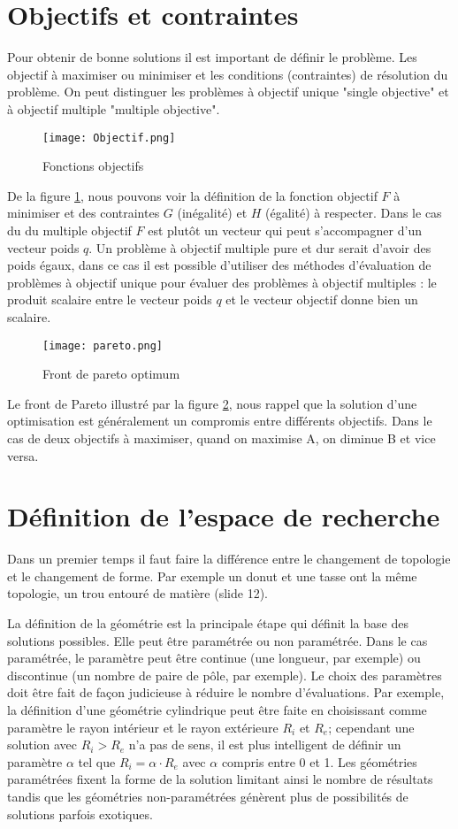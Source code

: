 \section{Objectifs et contraintes}
Pour obtenir de bonne solutions il est important de définir le problème. Les objectif à maximiser ou minimiser et les conditions (contraintes) de résolution du problème. On peut distinguer les problèmes à objectif unique "single objective" et à objectif multiple "multiple objective". 
\begin{figure}[H]
    \centering
    \texttt{[image: Objectif.png]}
    \caption{Fonctions objectifs}
    \label{fig:objection}
\end{figure}
De la figure \ref{fig:objection}, nous pouvons voir la définition de la fonction objectif $F$ à minimiser et des contraintes $G$ (inégalité) et $H$ (égalité) à respecter. Dans le cas du du multiple objectif $F$ est plutôt un vecteur qui peut s'accompagner d'un vecteur poids $q$. Un problème à objectif multiple pure et dur serait d'avoir des poids égaux, dans ce cas il est possible d'utiliser des méthodes d'évaluation de problèmes à objectif unique pour évaluer des problèmes à objectif multiples : le produit scalaire entre le vecteur poids $q$ et le vecteur objectif donne bien un scalaire. 
\begin{figure}[H]
    \centering
    \texttt{[image: pareto.png]}
    \caption{Front de pareto optimum}
    \label{fig:Pareto}
\end{figure}
Le front de Pareto illustré par la figure \ref{fig:Pareto}, nous rappel que la solution d'une optimisation est généralement un compromis entre différents objectifs. Dans le cas de deux objectifs à maximiser, quand on maximise A, on diminue B et vice versa.

\section{Définition de l'espace de recherche}
Dans un premier temps il faut faire la différence entre le changement de topologie et le changement de forme. Par exemple un donut et une tasse ont la même topologie, un trou entouré de matière (slide 12). 

La définition de la géométrie est la principale étape qui définit la base des solutions possibles. Elle peut être paramétrée ou non paramétrée. Dans le cas paramétrée, le paramètre peut être continue (une longueur, par exemple) ou discontinue (un nombre de paire de pôle, par exemple). Le choix des paramètres doit être fait de façon judicieuse à réduire le nombre d'évaluations. Par exemple, la définition d'une géométrie cylindrique peut être faite en choisissant comme paramètre le rayon intérieur et le rayon extérieure $ R_i$ et $R_e$; cependant une solution avec $R_i>R_e$ n'a pas de sens, il est plus intelligent de définir un paramètre $\alpha$ tel que $R_i = \alpha \cdot R_e$  avec $\alpha$ compris entre 0 et 1.  Les géométries paramétrées fixent la forme de la solution limitant ainsi le nombre de résultats tandis que les géométries non-paramétrées génèrent plus de possibilités de solutions parfois exotiques. 

